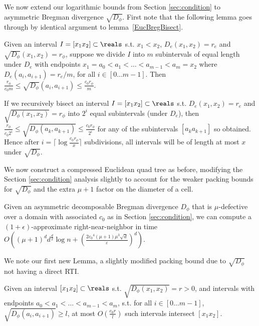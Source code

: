 \documentclass[11pt]{myclass}
\newcommand{\breg}{\ensuremath{D_\phi}}
\newcommand{\eps}{\varepsilon}
\begin{document}
We now extend our logarithmic bounds from Section \ref{sec:condition} 
to asymmetric Bregman divergence $\sqrt{\breg}$.
First note that the following lemma goes through by identical argument 
to lemma~\ref{EucBregBisect}.
\begin{lemma}\label{EucABregBisect}
Given an interval $I = [x_1 x_2] \subset \reals$ s.t. $x_1 < x_2$, $D_e(x_1, x_2) = r_e$ and $\sqrt{\breg}(x_1,x_2) = r_{\phi}$, suppose we divide $I$ into $m$ subintervals of equal length under $D_e$ with endpoints $x_1 = a_0 < a_1 < \ldots < a_{m-1} < a_m = x_2$ where $D_e (a_i, a_{i+1}) = r_e /m$, for all $i\in [0 \ldots m-1]$. Then $\frac{r_{\phi} }{c_0 m } \leq \sqrt{\breg} (a_i, a_{i+1}) \leq  \frac{c_0 r_{\phi}}{m}$.
\end{lemma}
\begin{corollary}\label{repabis}
If we recursively bisect an interval $I = [x_1 x_2] \subset \reals$ 
s.t. $D_e(x_1, x_2) = r_e$ and $\sqrt{\breg(x_1,x_2)} = r_{\phi}$ into $2^i$ equal subintervals (under $D_e$), then $\frac{r_{\phi} }{c_0 2^i } \leq \sqrt{\breg (a_k, a_{k+1}) }\leq  \frac{c_0 r_{\phi}}{2^i}$ for any of the subintervals $[a_k a_{k+1}]$ so obtained.
Hence after $i = \lceil \log \frac{c_0 r_{\phi}}{ x} \rceil$ subdivisions, all intervals will be of length at most $x$ under $\sqrt{\breg}$.
\end{corollary}

We now construct a compressed Euclidean quad tree as before, 
modifying the Section \ref{sec:condition} analysis slightly 
to account for the weaker packing bounds for $\sqrt{\breg}$ and the extra $\mu+1$ factor on the diameter of a cell. 

\begin{theorem}
  Given an asymmetric decomposable Bregman 
divergence $D_\phi$ that is $\mu$-defective over a domain  with associated 
$c_0$ as in Section \ref{sec:condition}, we can compute a $(1+\epsilon)$-approximate right-near-neighbor in 
time $O \left((\mu+1)^d d^{\frac{d}{2}} \log n + ( \frac{2{c_0}^4 ( \mu+1) \mu^3 \sqrt{d}}{\eps})^d \right)$.
\end{theorem}



We note our first new Lemma, a slightly modified packing bound due to $\sqrt{\breg}$ not having a direct RTI.

\begin{lemma}\label{cpack}
 Given an interval $[x_1 x_2] \subset \reals$ s.t. $\sqrt{\breg(x_1,x_2)} = r > 0$, and 
intervals with endpoints $a_0 < a_1 < \ldots < a_{m-1} < a_m$, s.t. for all $i\in[0 \ldots m-1]$, $\sqrt{\breg(a_i, a_{i+1})} \geq l$, 
at most $O(\frac{c_0 r}{l})$ such intervals intersect $[x_1 x_2]$.
\end{lemma}
\end{document}
